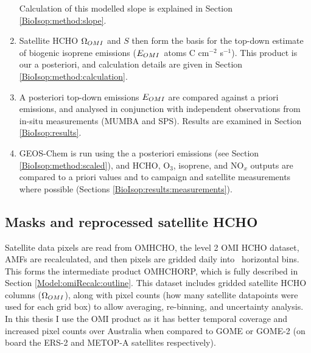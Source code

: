 \begin{enumerate}
        Calculation of this modelled slope is explained in Section \ref{BioIsop:method:slope}.
      \item 
        Satellite HCHO $\Omega_{OMI}$ and $S$ then form the basis for the top-down estimate of biogenic isoprene emissions ($E_{OMI}$~atoms C cm$^{-2}$ s$^{-1}$).
        This product is our a posteriori, and calculation details are given in Section \ref{BioIsop:method:calculation}.
      \item 
        A posteriori top-down emissions $E_{OMI}$ are compared against a priori emissions, and analysed in conjunction with independent observations from in-situ measurements (MUMBA and SPS).
        Results are examined in Section \ref{BioIsop:results}.
      \item 
        GEOS-Chem is run using the a posteriori emissions (see Section \ref{BioIsop:method:scaled}), and HCHO, O$_3$, isoprene, and NO$_x$ outputs are compared to a priori values and to campaign and satellite measurements where possible (Sections \ref{BioIsop:results:measurements}).
    \end{enumerate}
    
  
  \subsection{Masks and reprocessed satellite HCHO}
    
    Satellite data pixels are read from OMHCHO, the level 2 OMI HCHO dataset, AMFs are recalculated, and then pixels are gridded daily into \highhr ~horizontal bins. 
    This forms the intermediate product OMHCHORP, which is fully described in Section \ref{Model:omiRecalc:outline}.
    This dataset includes gridded satellite HCHO columns ($\Omega_{OMI}$), along with pixel counts (how many satellite datapoints were used for each grid box) to allow averaging, re-binning, and uncertainty analysis.
    In this thesis I use the OMI product as it has better temporal coverage and increased pixel counts over Australia when compared to GOME or GOME-2 (on board the ERS-2 and METOP-A satellites respectively).
    
